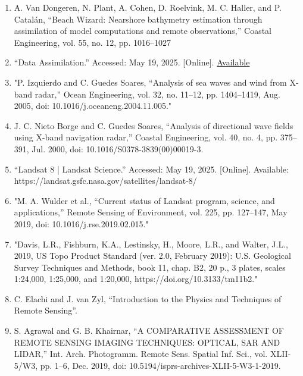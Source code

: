 \documentclass{article}
\begin{document}
{\begin{enumerate}
    \item{A. Van Dongeren, N. Plant, A. Cohen, D. Roelvink, M. C. Haller, and P. Catalán, “Beach Wizard: Nearshore bathymetry estimation through assimilation of model computations and remote observations,” Coastal Engineering, vol. 55, no. 12, pp. 1016–1027}

    \item{“Data Assimilation.” Accessed: May 19, 2025. [Online]. \href{https://www.aoml.noaa.gov/hrd/themes/0/}{Available}}

    \item{"P. Izquierdo and C. Guedes Soares, “Analysis of sea waves and wind from X-band radar,” Ocean Engineering, vol. 32, no. 11–12, pp. 1404–1419, Aug. 2005, doi: 10.1016/j.oceaneng.2004.11.005."}

    \item{J. C. Nieto Borge and C. Guedes Soares, “Analysis of directional wave fields using X-band navigation radar,” Coastal Engineering, vol. 40, no. 4, pp. 375–391, Jul. 2000, doi: 10.1016/S0378-3839(00)00019-3.}

    \item{“Landsat 8 | Landsat Science.” Accessed: May 19, 2025. [Online]. Available: https://landsat.gsfc.nasa.gov/satellites/landsat-8/}

    \item{"M. A. Wulder et al., “Current status of Landsat program, science, and applications,” Remote Sensing of Environment, vol. 225, pp. 127–147, May 2019, doi: 10.1016/j.rse.2019.02.015."}

    \item{"Davis, L.R., Fishburn, K.A., Lestinsky, H., Moore, L.R., and Walter, J.L., 2019, US Topo Product Standard (ver. 2.0, February 2019): U.S. Geological Survey Techniques and Methods, book 11, chap. B2, 20 p., 3 plates, scales 1:24,000, 1:25,000, and 1:20,000, https://doi.org/10.3133/tm11b2."}

    \item{C. Elachi and J. van Zyl, “Introduction to the Physics and Techniques of Remote Sensing”.}

    \item{S. Agrawal and G. B. Khairnar, “A COMPARATIVE ASSESSMENT OF REMOTE SENSING IMAGING TECHNIQUES: OPTICAL, SAR AND LIDAR,” Int. Arch. Photogramm. Remote Sens. Spatial Inf. Sci., vol. XLII-5/W3, pp. 1–6, Dec. 2019, doi: 10.5194/isprs-archives-XLII-5-W3-1-2019.}


\end{enumerate}}
\end{document}
